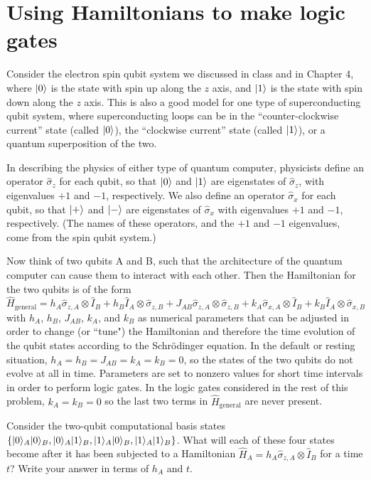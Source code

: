 \documentclass{../phys084}
\begin{document}
\section{Using Hamiltonians to make logic gates}

\begin{exercise}
  Consider the electron spin qubit system we discussed in class and in
  Chapter 4, where \(\ket 0\) is the state with spin up along the
  \(z\) axis, and \(\ket 1\) is the state with spin down along the
  \(z\) axis.  This is also a good model for one type of
  superconducting qubit system, where superconducting loops can be in
  the ``counter-clockwise current'' state (called \(\ket 0\)), the
  ``clockwise current'' state (called \(\ket 1\)), or a quantum
  superposition of the two.

  In describing the physics of either type of quantum computer,
  physicists define an operator \(\hat \sigma_z\) for each qubit, so
  that \(\ket 0\) and \(\ket 1\) are eigenstates of \(\hat \sigma_z\),
  with eigenvalues \(+1\) and \(-1\), respectively.  We also define an
  operator \(\hat \sigma_x\) for each qubit, so that \(\ket +\) and
  \(\ket -\) are eigenstates of \(\hat \sigma_x\) with eigenvalues
  \(+1\) and \(-1\), respectively.  (The names of these operators, and
  the \(+1\) and \(-1\) eigenvalues, come from the spin qubit system.)

  Now think of two qubits A and B, such that the architecture of the
  quantum computer can cause them to interact with each other.  Then
  the Hamiltonian for the two qubits is of the form
  \[
    \hat H_\text{general}
    = h_A \hat \sigma_{z,A} \otimes \hat I_B
    + h_B \hat I_A \otimes \hat \sigma_{z,B}
    + J_{AB} \hat \sigma_{z,A} \otimes \hat \sigma_{z,B}
    + k_A \hat \sigma_{x,A} \otimes \hat I_B
    + k_B \hat I_A \otimes \hat \sigma_{x,B}
  \]
  with \(h_A\), \(h_B\), \(J_{AB}\), \(k_A\), and \(k_B\) as numerical
  parameters that can be adjusted in order to change (or ``tune") the
  Hamiltonian and therefore the time evolution of the qubit states
  according to the Schr\"odinger equation.  In the default or resting
  situation, \(h_A = h_B = J_{AB} = k_A = k_B = 0\), so the states of
  the two qubits do not evolve at all in time.  Parameters are set to
  nonzero values for short time intervals in order to perform logic
  gates.  In the logic gates considered in the rest of this problem,
  \(k_A = k_B = 0\) so the last two terms in \(\hat H_\text{general}\)
  are never present.

  \begin{problems}
  \item Consider the two-qubit computational basis states
    \(\set*{\ket 0_A \ket 0_B, \ket 0_A \ket 1_B, \ket 1_A \ket 0_B,
      \ket 1_A \ket 1_B}\).  What will each of these four states
    become after it has been subjected to a Hamiltonian
    \(\hat H_A = h_A \hat \sigma_{z,A} \otimes \hat I_B\) for a time
    \(t\)?  Write your answer in terms of \(h_A\) and \(t\).


\end{problems}
\end{exercise}
\end{document}
